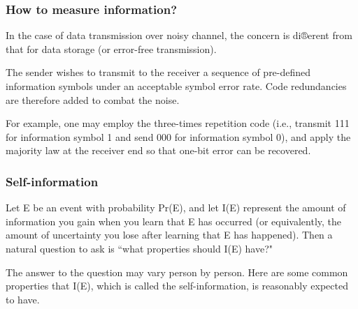 \documentclass[a4]{beamer}
\begin{document}
\begin{frame}
\frametitle{How to measure information?}

In the case of data transmission over noisy channel, the concern is di®erent
from that for data storage (or error-free transmission). 


The sender wishes to
transmit to the receiver a sequence of pre-defined information symbols under an
acceptable symbol error rate. Code redundancies are therefore added to combat
the noise.

For example, one may employ the three-times repetition code (i.e.,
transmit 111 for information symbol 1 and send 000 for information symbol
0), and apply the majority law at the receiver end so that one-bit error can
be recovered.


\end{frame}
\begin{frame}
\frametitle{Self-information}

Let E be an event with probability Pr(E), and let I(E) represent the amount
of information you gain when you learn that E has occurred (or equivalently,
the amount of uncertainty you lose after learning that E has happened). Then
a natural question to ask is ``what properties should I(E) have?" 

The answer
to the question may vary person by person. Here are some common properties
that I(E), which is called the self-information, is reasonably expected to have.

\end{frame}
\end{document}
